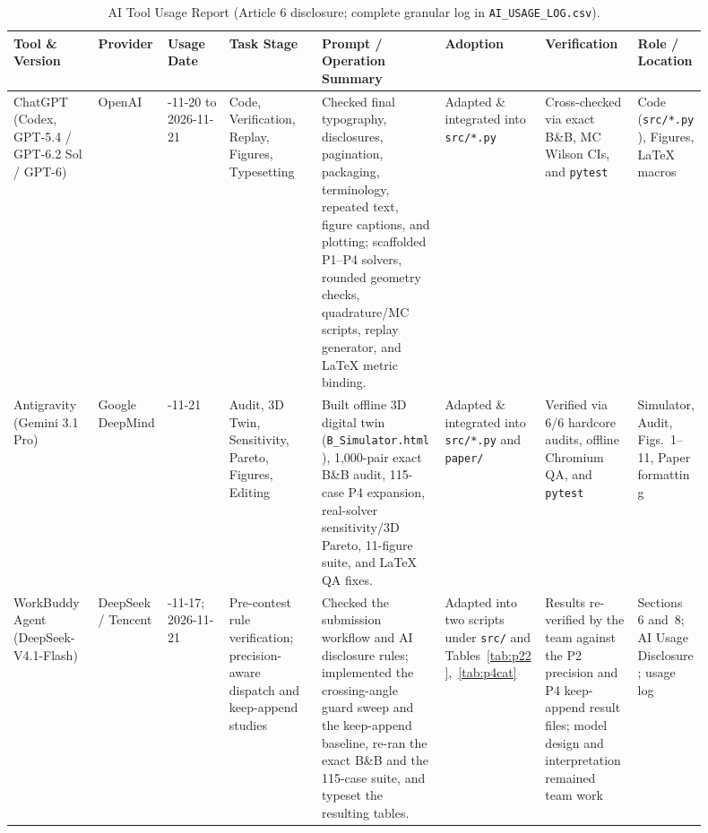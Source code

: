 \documentclass[12pt,a4paper]{article}
\begin{document}
\begin{table}[htbp]
\centering\scriptsize
\setlength{\tabcolsep}{2.4pt}
\caption{AI Tool Usage Report (Article 6 disclosure; complete granular log in \texttt{AI\_USAGE\_LOG.csv}).}
\label{tab:app-ai}
\begin{tabular}{@{}>{\raggedright\arraybackslash}p{0.11\linewidth}>{\raggedright\arraybackslash}p{0.09\linewidth}>{\raggedright\arraybackslash}p{0.08\linewidth}>{\raggedright\arraybackslash}p{0.12\linewidth}>{\raggedright\arraybackslash}p{0.16\linewidth}>{\raggedright\arraybackslash}p{0.13\linewidth}>{\raggedright\arraybackslash}p{0.12\linewidth}>{\raggedright\arraybackslash}p{0.09\linewidth}@{}}
\toprule
Tool \& Version & Provider & Usage Date & Task Stage & Prompt / Operation Summary & Adoption & Verification & Role / Location\\
\midrule
ChatGPT (Codex, GPT-5.4 / GPT-6.2 Sol / GPT-6) & OpenAI & 2026-11-20 to 2026-11-21 & Code, Verification, Replay, Figures, Typesetting & Checked final typography, disclosures, pagination, packaging, terminology, repeated text, figure captions, and plotting; scaffolded P1--P4 solvers, rounded geometry checks, quadrature/MC scripts, replay generator, and LaTeX metric binding. & Adapted \& integrated into \texttt{src/*.py} & Cross-checked via exact B\&B, MC Wilson CIs, and \texttt{pytest} & Code (\texttt{src/*.py}), Figures, LaTeX macros\\
Antigravity (Gemini 3.1 Pro) & Google DeepMind & 2026-11-21 & Audit, 3D Twin, Sensitivity, Pareto, Figures, Editing & Built offline 3D digital twin (\texttt{B\_Simulator.html}), 1,000-pair exact B\&B audit, 115-case P4 expansion, real-solver sensitivity/3D Pareto, 11-figure suite, and LaTeX QA fixes. & Adapted \& integrated into \texttt{src/*.py} and \texttt{paper/} & Verified via 6/6 hardcore audits, offline Chromium QA, and \texttt{pytest} & Simulator, Audit, Figs.~1--11, Paper formatting\\
WorkBuddy Agent (DeepSeek-V4.1-Flash) & DeepSeek / Tencent & 2026-11-17; 2026-11-21 & Pre-contest rule verification; precision-aware dispatch and keep-append studies & Checked the submission workflow and AI disclosure rules; implemented the crossing-angle guard sweep and the keep-append baseline, re-ran the exact B\&B and the 115-case suite, and typeset the resulting tables. & Adapted into two scripts under \texttt{src/} and Tables~\ref{tab:p22},~\ref{tab:p4cat} & Results re-verified by the team against the P2 precision and P4 keep-append result files; model design and interpretation remained team work & Sections~6 and~8; AI Usage Disclosure; usage log\\
\bottomrule
\end{tabular}
\end{table}
\end{document}
